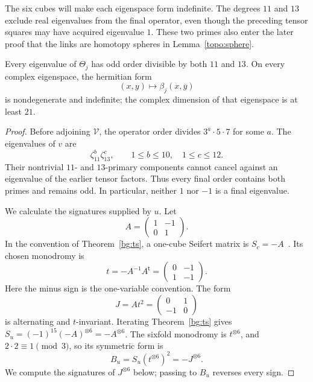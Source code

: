 The six cubes will make each eigenspace form indefinite.  The degrees
$11$ and $13$ exclude real eigenvalues from the final operator, even
though the preceding tensor squares may have acquired eigenvalue $1$.
These two primes also enter the later proof that the links are homotopy
spheres in Lemma~\ref{topo:sphere}.

\begin{lemma}
\label{global:indefinite}
Every eigenvalue of $\Theta_j$ has odd order divisible by both $11$
and $13$.  On every complex eigenspace, the hermitian form
\[
 (x,y)\longmapsto\beta_j(x,\overline y)
\]
is nondegenerate and indefinite; the complex dimension of that
eigenspace is at least $21$.
\end{lemma}

\begin{proof}
Before adjoining $\mathcal V$, the operator order divides
$3^a\cdot5\cdot7$ for some $a$.  The eigenvalues of $v$ are
\[
 \zeta_{11}^b\zeta_{13}^c,
 \qquad 1\le b\le10,\quad 1\le c\le12.
\]
Their nontrivial $11$- and $13$-primary components cannot cancel
against an eigenvalue of the earlier tensor factors.  Thus every
final order contains both primes and remains odd.  In particular,
neither $1$ nor $-1$ is a final eigenvalue.

We calculate the signatures supplied by $u$.  Let
\[
 A=\begin{pmatrix}1&-1\\0&1\end{pmatrix}.
\]
In the convention of Theorem~\ref{bg:ts}, a one-cube Seifert matrix
is $S_c=-A$~\cite[Corollary~3]{Sakamoto1974}.  Its chosen monodromy is
\[
 t=-A^{-1}A^{\mathsf t}
   =\begin{pmatrix}0&-1\\1&-1\end{pmatrix}.
\]
Here the minus sign is the one-variable convention.  The form
\[
 J=At^2=\begin{pmatrix}0&1\\-1&0\end{pmatrix}
\]
is alternating and $t$-invariant.  Iterating Theorem~\ref{bg:ts}
gives $S_u=(-1)^{15}(-A)^{\otimes6}=-A^{\otimes6}$.
The sixfold monodromy is $t^{\otimes6}$, and
$2\cdot2\equiv1\pmod3$, so its symmetric form is
\[
 B_u=S_u(t^{\otimes6})^2=-J^{\otimes6}.
\]
We compute the signatures of $J^{\otimes6}$ below; passing to $B_u$
reverses every sign.


\end{proof}
